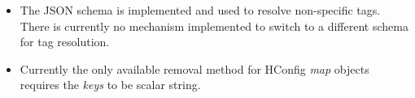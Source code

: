 
\begin{itemize}
\item The JSON schema is implemented and used to resolve non-specific tags.
  There is currently no mechanism implemented to switch to a different schema
  for tag resolution.
\item Currently the only available removal method for HConfig {\em map}
  objects requires the {\em keys} to be scalar string.
\end{itemize}
